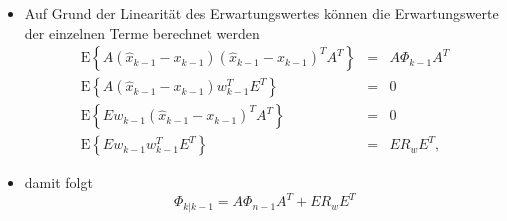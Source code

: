 \documentclass[slidestop,compress,mathserif, aspectratio = 169]{beamer}
\begin{document}
{\begin{itemize}
\begin{equation}
\begin{split}
-   {A} \left( \hat{ {x}}_{k-1} -  {x}_{k-1} \right)  {w}_{k-1}^T  {E}^T \\
&+  {E w}_{k-1} \left( \hat{ {x}}_{k-1} -  {x}_{k-1} \right)^T  {A}^T +  {E w}_{k-1}  {w}_{k-1}^T  {E}^T
\end{split}
\end{equation}
\item Auf Grund der Linearit\"at des Erwartungswertes k\"onnen die Erwartungswerte der einzelnen Terme berechnet werden
\begin{eqnarray}
\mathrm{E} \left\{ {A} \left( \hat{{x}}_{k-1} - {x}_{k-1} \right) 
\left( \hat{{x}}_{k-1} - {x}_{k-1} \right)^T {A}^T \right\} & = & {A} \Phi_{k-1} {A}^T \\
\mathrm{E} \left\{ {A} \left( \hat{{x}}_{k-1} - {x}_{k-1} \right) {w}_{k-1}^T {E}^T \right\} & = & 0 \\
\mathrm{E} \left\{ {E w}_{k-1} \left( \hat{{x}}_{k-1} - {x}_{k-1} \right)^T {A}^T \right\} & = & 0 \\
\mathrm{E} \left\{ {E w}_{k-1} {w}_{k-1}^T {E}^T \right\} & = & {E} {R}_w {E}^T,
\end{eqnarray}
\item damit folgt
\begin{equation}
\label{Eqn-KFSECovMatFinal}
\Phi_{k|k-1} =  {A} \Phi_{n-1} {A}^T  + {E} {R}_w {E}^T
\end{equation}
\end{itemize}
}

\end{document}
